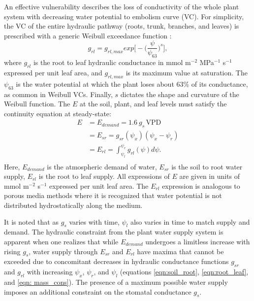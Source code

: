 \documentclass[utf8]{frontiersSCNS} %
\begin{document}
An effective vulnerability describes the loss of conductivity of the whole plant system with decreasing water potential to embolism curve (VC). For simplicity, the VC of the entire hydraulic pathway (roots, trunk, branches, and leaves) is prescribed with a generic Weibull exceedance function \citep{sperry_what_2015}:
\begin{equation}
    \label{eqn:root_leaf}
    g_{rl} = g_{rl,max}exp\Big[-\Big(\frac{\psi}{\psi_{63}}\Big)^s\Big],
\end{equation}
where $g_{rl}$ is the root to leaf hydraulic conductance in mmol m$^{-2}$ MPa$^{-1}$ s$^{-1}$ expressed per unit leaf area, and $g_{rl,max}$ is its maximum value at saturation. The $\psi_{63}$ is the water potential at which the plant loses about 63\% of its conductance, as common in Weibull VCs. Finally, $s$ dictates the shape and curvature of the Weibull function. 
The $E$ at the soil, plant, and leaf levels must satisfy the continuity equation at steady-state:
\begin{equation}
    \label{eqn: mass_cons}
        \begin{split}
        E & = E_{demand} = 1.6\: g_s\, \text{VPD} \\
        & = E_{sr} = g_{sr}(\psi_x)(\psi_x - \psi_r)\\
        & = E_{rl} = \int_{\psi_l}^{\psi_r} g_{rl}(\psi) d\psi. \\
        \end{split}
\end{equation}
Here, $E_{demand}$ is the atmospheric demand of water, $E_{sr}$ is the soil to root water supply, $E_{rl}$ is the root to leaf supply. All expressions of $E$ are given in units of mmol m$^{-2}$ s$^{-1}$ expressed per unit leaf area. The $E_{rl}$ expression is analogous to porous media methods where it is recognized that water potential is not distributed hydrostatically along the medium.

It is noted that as $g_s$ varies with time, $\psi_l$ also varies in time to match supply and demand. The hydraulic constraint from the plant water supply system is apparent when one realizes that while $E_{demand}$ undergoes a limitless increase with rising $g_s$, water supply through $E_{sr}$ and $E_{rl}$ have maxima that cannot be exceeded due to concomitant decreases in hydraulic conductance functions $g_{sr}$ and $g_{rl}$ with increasing $\psi_x$, $\psi_r$, and $\psi_l$ (equations \ref{eqn:soil_root}, \ref{eqn:root_leaf}, and \ref{eqn: mass_cons}). The presence of a maximum possible water supply imposes an additional constraint on the stomatal conductance $g_s$.  
\end{document}
